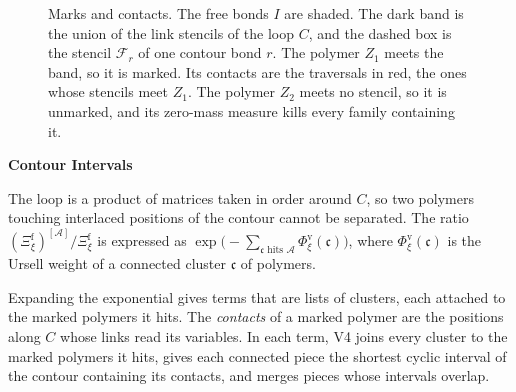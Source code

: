 \documentclass[11pt,a4paper]{article}
\newcommand{\subhead}[1]{\par\vspace{4pt}\textbf{\color{ink}#1}\par}
\begin{document}
\begin{figure}[ht]
\centering
{}
\caption{Marks and contacts. The free bonds $I$ are shaded. The dark band is the union of the link stencils of the loop $C$, and the dashed box is the stencil $\mathcal F_r$ of one contour bond $r$. The polymer $Z_1$ meets the band, so it is marked. Its contacts are the traversals in red, the ones whose stencils meet $Z_1$. The polymer $Z_2$ meets no stencil, so it is unmarked, and its zero-mass measure kills every family containing it.}
\end{figure}

\subhead{Contour Intervals}
The loop is a product of matrices taken in order around $C$, so two polymers touching interlaced positions of the contour cannot be separated. The ratio $(\Xi^{\mathrm f}_\xi)^{[\mathcal A]}/\Xi^{\mathrm f}_\xi$ is expressed as $\exp\bigl(-\sum_{\mathfrak c\text{ hits }\mathcal A}\Phi^{\mathrm v}_\xi(\mathfrak c)\bigr)$, where $\Phi^{\mathrm v}_\xi(\mathfrak c)$ is the Ursell weight of a connected cluster $\mathfrak c$ of polymers. 

Expanding the exponential gives terms that are lists of clusters, each attached to the marked polymers it hits. The \emph{contacts} of a marked polymer are the positions along $C$ whose links read its variables. In each term, V4 joins every cluster to the marked polymers it hits, gives each connected piece the shortest cyclic interval of the contour containing its contacts, and merges pieces whose intervals overlap.
\end{document}
